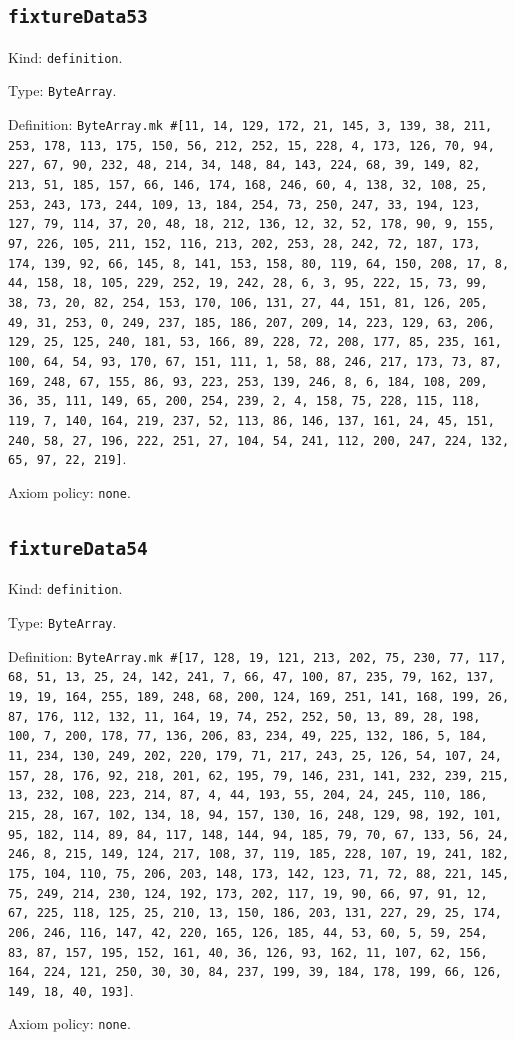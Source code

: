 \documentclass[11pt]{article}
\begin{document}
\subsection*{\texttt{fixtureData53}}
\noindent Kind: \texttt{definition}.\par
\noindent Type: \texttt{ByteArray}.\par
\noindent Definition: \texttt{ByteArray.mk \#[11, 14, 129, 172, 21, 145, 3, 139, 38, 211, 253, 178, 113, 175, 150, 56, 212, 252, 15, 228, 4, 173, 126, 70, 94, 227, 67, 90, 232, 48, 214, 34, 148, 84, 143, 224, 68, 39, 149, 82, 213, 51, 185, 157, 66, 146, 174, 168, 246, 60, 4, 138, 32, 108, 25, 253, 243, 173, 244, 109, 13, 184, 254, 73, 250, 247, 33, 194, 123, 127, 79, 114, 37, 20, 48, 18, 212, 136, 12, 32, 52, 178, 90, 9, 155, 97, 226, 105, 211, 152, 116, 213, 202, 253, 28, 242, 72, 187, 173, 174, 139, 92, 66, 145, 8, 141, 153, 158, 80, 119, 64, 150, 208, 17, 8, 44, 158, 18, 105, 229, 252, 19, 242, 28, 6, 3, 95, 222, 15, 73, 99, 38, 73, 20, 82, 254, 153, 170, 106, 131, 27, 44, 151, 81, 126, 205, 49, 31, 253, 0, 249, 237, 185, 186, 207, 209, 14, 223, 129, 63, 206, 129, 25, 125, 240, 181, 53, 166, 89, 228, 72, 208, 177, 85, 235, 161, 100, 64, 54, 93, 170, 67, 151, 111, 1, 58, 88, 246, 217, 173, 73, 87, 169, 248, 67, 155, 86, 93, 223, 253, 139, 246, 8, 6, 184, 108, 209, 36, 35, 111, 149, 65, 200, 254, 239, 2, 4, 158, 75, 228, 115, 118, 119, 7, 140, 164, 219, 237, 52, 113, 86, 146, 137, 161, 24, 45, 151, 240, 58, 27, 196, 222, 251, 27, 104, 54, 241, 112, 200, 247, 224, 132, 65, 97, 22, 219]}.\par
\noindent Axiom policy: \texttt{none}.\par
\subsection*{\texttt{fixtureData54}}
\noindent Kind: \texttt{definition}.\par
\noindent Type: \texttt{ByteArray}.\par
\noindent Definition: \texttt{ByteArray.mk \#[17, 128, 19, 121, 213, 202, 75, 230, 77, 117, 68, 51, 13, 25, 24, 142, 241, 7, 66, 47, 100, 87, 235, 79, 162, 137, 19, 19, 164, 255, 189, 248, 68, 200, 124, 169, 251, 141, 168, 199, 26, 87, 176, 112, 132, 11, 164, 19, 74, 252, 252, 50, 13, 89, 28, 198, 100, 7, 200, 178, 77, 136, 206, 83, 234, 49, 225, 132, 186, 5, 184, 11, 234, 130, 249, 202, 220, 179, 71, 217, 243, 25, 126, 54, 107, 24, 157, 28, 176, 92, 218, 201, 62, 195, 79, 146, 231, 141, 232, 239, 215, 13, 232, 108, 223, 214, 87, 4, 44, 193, 55, 204, 24, 245, 110, 186, 215, 28, 167, 102, 134, 18, 94, 157, 130, 16, 248, 129, 98, 192, 101, 95, 182, 114, 89, 84, 117, 148, 144, 94, 185, 79, 70, 67, 133, 56, 24, 246, 8, 215, 149, 124, 217, 108, 37, 119, 185, 228, 107, 19, 241, 182, 175, 104, 110, 75, 206, 203, 148, 173, 142, 123, 71, 72, 88, 221, 145, 75, 249, 214, 230, 124, 192, 173, 202, 117, 19, 90, 66, 97, 91, 12, 67, 225, 118, 125, 25, 210, 13, 150, 186, 203, 131, 227, 29, 25, 174, 206, 246, 116, 147, 42, 220, 165, 126, 185, 44, 53, 60, 5, 59, 254, 83, 87, 157, 195, 152, 161, 40, 36, 126, 93, 162, 11, 107, 62, 156, 164, 224, 121, 250, 30, 30, 84, 237, 199, 39, 184, 178, 199, 66, 126, 149, 18, 40, 193]}.\par
\noindent Axiom policy: \texttt{none}.\par
\end{document}
